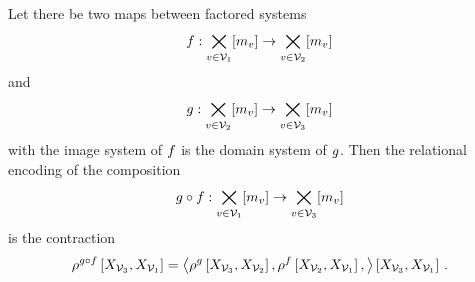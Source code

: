 \begin{theorem}\label{the:compositionByContraction}
	Let there be two maps between factored systems
	\begin{align*}
		f : \bigtimes_{v\in\mathcal{V}_1}[m_{v}] \rightarrow \bigtimes_{v\in\mathcal{V}_2}[m_{v}]
	\end{align*}
	and
	\begin{align*}
		g : \bigtimes_{v\in\mathcal{V}_2}[m_{v}] \rightarrow \bigtimes_{v\in\mathcal{V}_3}[m_{v}]
	\end{align*}
	with the image system of $f$ is the domain system of $g$.
	Then the relational encoding of the composition
	\begin{align*}
		{g}\circ{f} : \bigtimes_{v\in\mathcal{V}_1}[m_{v}] \rightarrow \bigtimes_{v\in\mathcal{V}_3}[m_{v}]
	\end{align*}
	is the contraction
	\begin{align*}
		\rho^{{g}\circ{f}}\left[X_{\mathcal{V}_3},X_{\mathcal{V}_1}\right]
		= \left\langle 
			\rho^{g}\left[X_{\mathcal{V}_3},X_{\mathcal{V}_2}\right],
			\rho^{f}\left[X_{\mathcal{V}_2},X_{\mathcal{V}_1}\right],
		\right\rangle \left[ X_{\mathcal{V}_3},X_{\mathcal{V}_1} \right] \, .
	\end{align*}
\end{theorem}
